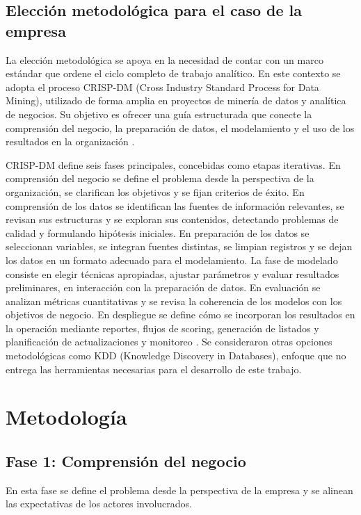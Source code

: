 \subsection{Elección metodológica para el caso de la empresa}

La elección metodológica se apoya en la necesidad de contar con un marco estándar que ordene el ciclo completo de trabajo analítico. En este contexto se adopta el proceso CRISP-DM (Cross Industry Standard Process for Data Mining), utilizado de forma amplia en proyectos de minería de datos y analítica de negocios. Su objetivo es ofrecer una guía estructurada que conecte la comprensión del negocio, la preparación de datos, el modelamiento y el uso de los resultados en la organización \citep{Chapman2000}.

CRISP-DM define seis fases principales, concebidas como etapas iterativas. En comprensión del negocio se define el problema desde la perspectiva de la organización, se clarifican los objetivos y se fijan criterios de éxito. En comprensión de los datos se identifican las fuentes de información relevantes, se revisan sus estructuras y se exploran sus contenidos, detectando problemas de calidad y formulando hipótesis iniciales. En preparación de los datos se seleccionan variables, se integran fuentes distintas, se limpian registros y se dejan los datos en un formato adecuado para el modelamiento. La fase de modelado consiste en elegir técnicas apropiadas, ajustar parámetros y evaluar resultados preliminares, en interacción con la preparación de datos. En evaluación se analizan métricas cuantitativas y se revisa la coherencia de los modelos con los objetivos de negocio. En despliegue se define cómo se incorporan los resultados en la operación mediante reportes, flujos de scoring, generación de listados y planificación de actualizaciones y monitoreo \citep{Chapman2000,Kumar2010}. Se consideraron otras opciones metodológicas como KDD (Knowledge Discovery in Databases), enfoque que no entrega las herramientas necesarias para el desarrollo de este trabajo.

\section{Metodología}

\subsection{Fase 1: Comprensión del negocio}

En esta fase se define el problema desde la perspectiva de la empresa y se alinean las expectativas de los actores involucrados.

